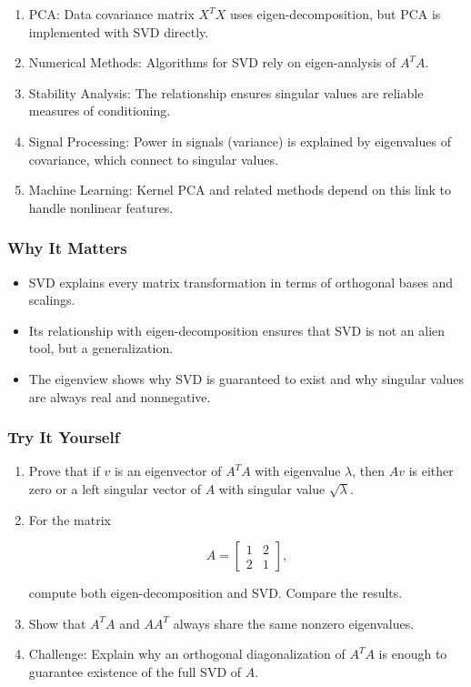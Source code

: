 \documentclass[
  letterpaper,
  DIV=11,
  numbers=noendperiod]{scrreprt}
\providecommand{\tightlist}{%
  \setlength{\itemsep}{0pt}\setlength{\parskip}{0pt}}
\begin{document}
\begin{enumerate}
\def\labelenumi{\arabic{enumi}.}
\tightlist
\item
  PCA: Data covariance matrix \(X^T X\) uses eigen-decomposition, but
  PCA is implemented with SVD directly.
\item
  Numerical Methods: Algorithms for SVD rely on eigen-analysis of
  \(A^T A\).
\item
  Stability Analysis: The relationship ensures singular values are
  reliable measures of conditioning.
\item
  Signal Processing: Power in signals (variance) is explained by
  eigenvalues of covariance, which connect to singular values.
\item
  Machine Learning: Kernel PCA and related methods depend on this link
  to handle nonlinear features.
\end{enumerate}

\subsubsection{Why It Matters}\label{why-it-matters-79}

\begin{itemize}
\tightlist
\item
  SVD explains every matrix transformation in terms of orthogonal bases
  and scalings.
\item
  Its relationship with eigen-decomposition ensures that SVD is not an
  alien tool, but a generalization.
\item
  The eigenview shows why SVD is guaranteed to exist and why singular
  values are always real and nonnegative.
\end{itemize}

\subsubsection{Try It Yourself}\label{try-it-yourself-82}

\begin{enumerate}
\def\labelenumi{\arabic{enumi}.}
\item
  Prove that if \(v\) is an eigenvector of \(A^T A\) with eigenvalue
  \(\lambda\), then \(Av\) is either zero or a left singular vector of
  \(A\) with singular value \(\sqrt{\lambda}\).
\item
  For the matrix

  \[
  A = \begin{bmatrix}1 & 2 \\ 2 & 1\end{bmatrix},
  \]

  compute both eigen-decomposition and SVD. Compare the results.
\item
  Show that \(A^T A\) and \(AA^T\) always share the same nonzero
  eigenvalues.
\item
  Challenge: Explain why an orthogonal diagonalization of \(A^T A\) is
  enough to guarantee existence of the full SVD of \(A\).
\end{enumerate}
\end{document}
